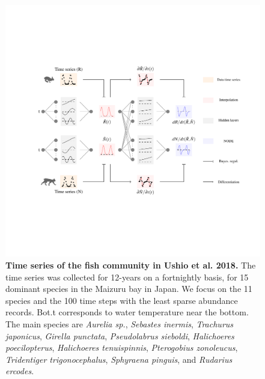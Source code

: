 \documentclass[11pt, oneside]{article}
\begin{document}
\begin{figure}[H]
\includegraphics[width=1\linewidth,page=26]{figures/main.pdf}
\caption{
    \textbf{Time series of the fish community in Ushio et al. 2018.}
    The time series was collected for 12-years on a fortnightly basis, for 15 dominant species in the Maizuru bay in Japan. 
    We focus on the 11 species and the 100 time steps with the least sparse abundance records. 
    Bot.t corresponds to water temperature near the bottom. 
    The main species are \textit{Aurelia sp.}, \textit{Sebastes inermis}, \textit{Trachurus japonicus}, \textit{Girella punctata}, \textit{Pseudolabrus sieboldi}, \textit{Halichoeres poecilopterus}, \textit{Halichoeres tenuispinnis}, \textit{Pterogobius zonoleucus}, \textit{Tridentiger trigonocephalus}, \textit{Sphyraena pinguis}, and \textit{Rudarius ercodes}. 
}
\end{figure}
\newpage
\end{document}
